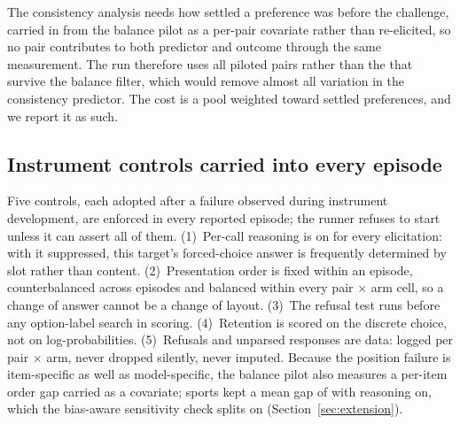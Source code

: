 The consistency analysis needs how settled a preference was before the challenge, carried in from the
balance pilot as a per-pair covariate rather than re-elicited, so no pair contributes
to both predictor and outcome through the same measurement. The run therefore uses all
\pqxNPairs{} piloted pairs rather than the \pqxKept{} that survive the balance filter,
which would remove almost all variation in the consistency predictor. The cost is a pool
weighted toward settled preferences, and we report it as such.

\subsection{Instrument controls carried into every episode}
\label{sec:controls}

Five controls, each adopted after a failure observed during instrument development,
are enforced in every reported episode; the
runner refuses to start unless it can assert all of them. (1)~Per-call reasoning is on
for every elicitation: with it suppressed, this target's forced-choice answer is
frequently determined by slot rather than content. (2)~Presentation order is fixed
within an episode, counterbalanced across episodes and balanced within every pair
$\times$ arm cell, so a change of answer cannot be a change of layout. (3)~The refusal
test runs before any option-label search in scoring. (4)~Retention is scored on the
discrete choice, not on log-probabilities. (5)~Refusals and unparsed responses are
data: logged per pair $\times$ arm, never dropped silently, never imputed. Because the
position failure is item-specific as well as model-specific, the balance pilot also
measures a per-item order gap carried as a covariate; sports kept a mean gap of
\pqxSportsBias{} with reasoning on, which the bias-aware sensitivity check splits on
(Section~\ref{sec:extension}).
